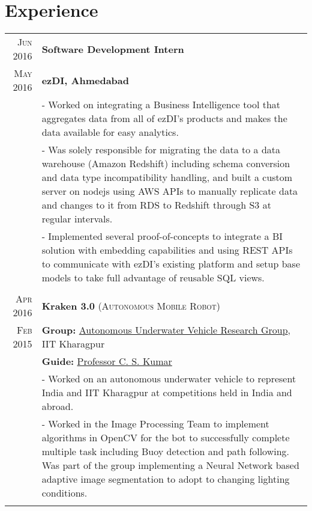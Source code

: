 \documentclass[a4paper,10pt]{extarticle} %
\begin{document}
\section{Experience}

\begin{tabular}{r|p{16cm}}

\textsc{Jun 2016} & \textbf{Software Development Intern}\\
\textsc{May 2016} & \textbf{ezDI, Ahmedabad}\\
& \footnotesize{- Worked on integrating a Business Intelligence tool that aggregates data from all of ezDI's products and makes the data available for easy analytics.}\\
& \footnotesize{- Was solely responsible for migrating the data to a data warehouse (Amazon Redshift) including schema conversion and data type incompatibility handling, and built a custom server on nodejs using AWS APIs to manually replicate data and changes to it from RDS to Redshift through S3 at regular intervals.}\\
& \footnotesize{- Implemented several proof-of-concepts to integrate a BI solution with embedding capabilities and using REST APIs to communicate with ezDI's existing platform and setup base models to take full advantage of reusable SQL views.}\\
\multicolumn{2}{c}{} \\

\textsc{Apr 2016} & \textbf{Kraken 3.0} \textsc{(Autonomous Mobile Robot)} \\
\textsc{Feb 2015} & \textbf{Group: }\textmd{\href{http://auv-iitkgp.in/}{Autonomous Underwater Vehicle Research Group}}, IIT Kharagpur\\
& \textbf{Guide: }\textmd{\href{http://iitkgp.ac.in/fac-profiles/showprofile.php?empcode=aWmdU}{Professor C. S. Kumar}}\\
& \footnotesize{- Worked on an autonomous underwater vehicle to represent India and IIT Kharagpur at competitions held in India and abroad.}\\
& \footnotesize{- Worked in the Image Processing Team to implement algorithms in OpenCV for the bot to successfully complete multiple task including Buoy detection and path following. Was part of the group implementing a Neural Network based adaptive image segmentation to adopt to changing lighting conditions.}\\
\multicolumn{2}{c}{} \\

\end{tabular}
\end{document}
